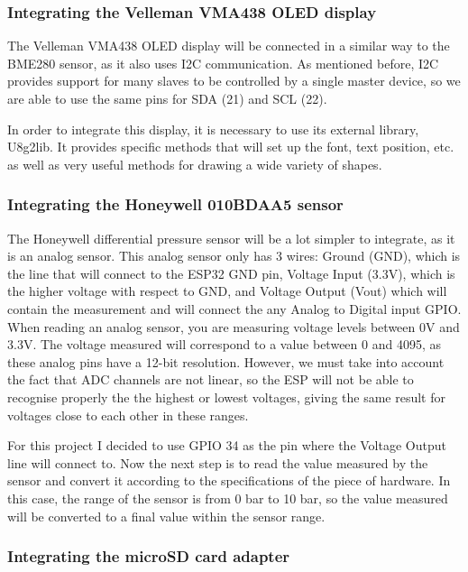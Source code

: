 \documentclass[12pt]{article}
\begin{document}
\subsubsection{Integrating the Velleman VMA438 OLED display}

The Velleman VMA438 OLED display will be connected in a similar way to the BME280 sensor, as it also uses I2C communication. As mentioned before, I2C provides support for many slaves to be controlled by a single master device, so we are able to use the same pins for SDA (21) and SCL (22).\par

In order to integrate this display, it is necessary to use its external library, U8g2lib. It provides specific methods that will set up the font, text position, etc. as well as very useful methods for drawing a wide variety of shapes.

\subsubsection{Integrating the Honeywell 010BDAA5 sensor}

The Honeywell differential pressure sensor will be a lot simpler to integrate, as it is an analog sensor. This analog sensor only has 3 wires: Ground (GND), which is the line that will connect to the ESP32 GND pin, Voltage Input (3.3V), which is the higher voltage with respect to GND, and Voltage Output (Vout) which will contain the measurement and will connect the any Analog to Digital input GPIO. When reading an analog sensor, you are measuring voltage levels between 0V and 3.3V. The voltage measured will correspond to a value between 0 and 4095, as these analog pins have a 12-bit resolution. However, we must take into account the fact that ADC channels are not linear, so the ESP will not be able to recognise properly the the highest or lowest voltages, giving the same result for voltages close to each other in these ranges.\par

For this project I decided to use GPIO 34 as the pin where the Voltage Output line will connect to. Now the next step is to read the value measured by the sensor and convert it according to the specifications of the piece of hardware. In this case, the range of the sensor is from 0 bar to 10 bar, so the value measured will be converted to a final value within the sensor range.

\subsubsection{Integrating the microSD card adapter}
\end{document}
